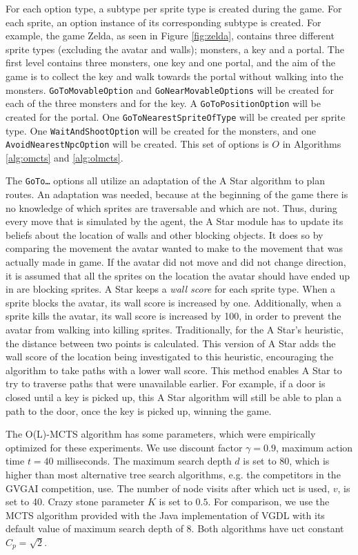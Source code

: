 For each option type, a subtype per sprite type is created during the game. For
each sprite, an option instance of its corresponding subtype is created. For
example, the game Zelda, as seen in Figure \ref{fig:zelda}, contains three
different sprite types (excluding the avatar and walls); monsters, a key and a
portal. The first level contains three monsters, one key and one portal, and the
aim of the game is to collect the key and walk towards the portal without
walking into the monsters. \texttt{GoToMovableOption} and
\texttt{GoNearMovableOptions} will be created for each of the three monsters and
for the key. A \texttt{GoToPositionOption} will be created for the portal.  One
\texttt{GoToNearestSpriteOfType} will be created per sprite type. One
\texttt{WaitAndShootOption} will be created for the monsters, and one
\texttt{AvoidNearestNpcOption} will be created. This set of options is $O$ in
Algorithms \ref{alg:omcts} and \ref{alg:olmcts}.

The \texttt{GoTo\ldots} options all utilize an adaptation of the A Star
algorithm to plan routes. An adaptation was needed, because at the
beginning of the game there is no knowledge of which sprites are traversable and
which are not. Thus, during every move that is simulated by the agent, the A
Star module has to update its beliefs about the location of walls and other
blocking objects. It does so by comparing the movement the avatar wanted to make
to the movement that was actually made in game. If the avatar did not move and
did not change direction, it is assumed that all the sprites on the location the
avatar should have ended up in are blocking sprites. A Star keeps a \emph{wall
score} for each sprite type. When a sprite blocks the avatar, its wall score is
increased by one. Additionally, when a sprite kills the avatar, its wall score
is increased by 100, in order to prevent the avatar from walking into killing
sprites. Traditionally, for the A Star's heuristic, the distance between two
points is calculated. This version of A Star adds the wall score of the location
being investigated to this heuristic, encouraging the algorithm to take paths
with a lower wall score. This method enables A Star to try to traverse paths
that were unavailable earlier. For example, if a door is closed until a key is
picked up, this A Star algorithm will still be able to plan a path to the door,
once the key is picked up, winning the game.

The O(L)-MCTS algorithm has some parameters, which were empirically optimized
for these experiments. We use discount factor $\gamma = 0.9$, maximum action
time $t = 40$ milliseconds. The maximum search depth $d$ is set to 80, which is
higher than most alternative tree search algorithms, e.g.  the competitors in
the GVGAI competition, use. The number of node visits after which \textsf{uct} is
used, $v$, is set to 40. Crazy stone parameter $K$ is set to $0.5$.
For comparison, we use the MCTS algorithm provided with the Java implementation
of VGDL with its default value of maximum search depth of 8. Both algorithms
have \textsf{uct} constant $C_p = \sqrt{2}$.


